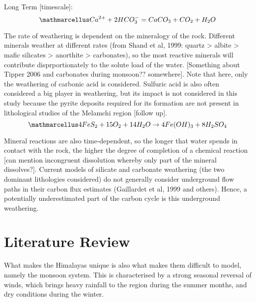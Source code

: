 \begin{tcolorbox}
{\begin{center}
    Long Term [timescale]:
    \[
    \ttmath{Ca^{2+} + 2HCO_3^- = CaCO_3 + CO_2 + H_2O}
    \]
    
    \end{center}

The rate of weathering is dependent on the mineralogy of the rock. Different minerals weather at different rates (from Shand et al, 1999: quartz > albite > mafic silicates > anorthite > carbonates), so the most reactive minerals will contribute disprportionately to the solute load of the water. [Something about Tipper 2006 and carbonates during monsoon?? somewhere]. Note that here, only the weathering of carbonic acid is considered. Sulfuric acid is also often considered a big player in weathering, but its impact is not considered in this study because the pyrite deposits required for its formation are not present in lithological studies of the Melamchi region [follow up].
\[
\ttmath{4FeS_2 + 15O_2 + 14H_2O \rightarrow 4Fe(OH)_3 + 8H_2SO_4}
\] 

Mineral reactions are also time-dependent, so the longer that water spends in contact with the rock, the higher the degree of completion of a chemical reaction [can mention incongruent dissolution whereby only part of the mineral dissolves?]. Current models of silicate and carbonate weathering (the two dominant lithologies considered) do not generally consider underground flow paths in their carbon flux estimates (Gaillardet et al, 1999 and others). Hence, a potentially underestimated part of the carbon cycle is this underground weathering.

}
\end{tcolorbox}


\newpage

\section{Literature Review}


What makes the Himalayas unique is also what makes them difficult to model, namely the monsoon system. This is characterised by a strong seasonal reversal of winds, which brings heavy rainfall to the region during the summer months, and dry conditions during the winter.



